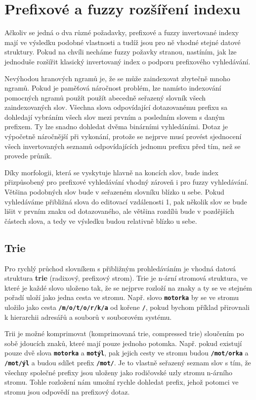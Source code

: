 \documentclass[12pt,letterpaper,oneside,openright]{book}
\newcommand{\bftt}[1]{\texttt{\textbf{#1}}}
\begin{document}
\section{Prefixové a fuzzy rozšíření indexu}
Ačkoliv se jedná o dva různé požadavky, prefixové a fuzzy invertované indexy
mají ve výsledku podobné vlastnosti a tudíž jsou pro ně vhodné stejné datové
struktury. Pokud na chvíli necháme fuzzy požavky stranou, nastíním, jak lze
jednoduše rozšířit klasický invertovaný index o podporu prefixového
vyhledávání.

Nevýhodou hranových ngramů je, že se může zaindexovat zbytečně mnoho ngramů.
Pokud je paměťová náročnost problém, lze namísto indexování pomocných ngramů
použít použít abecedně seřazený slovník všech zaindexovaných slov.  Všechna
slova odpovídající dotazovanému prefixu sa dohledají vybráním všech slov mezi
prvním a posledním slovem s daným prefixem. Ty lze snadno dohledat dvěma
binárními vyhledáními. Dotaz je výpočetně náročnější při vykonání, protože se
nejprve musí provést sjednocení všech invertovaných seznamů odpovídajících
jednomu prefixu před tím, než se provede průnik.

Díky morfologii, která se vyskytuje hlavně na koncích slov, bude index
přizpůsobený pro prefixové vyhledávání vhodný zároveň i pro fuzzy vyhledávání.
Většina podobných slov bude v seřazeném slovníku blízko u sebe. Pokud
vyhledáváme přibližná slova do editovací vzdálenosti 1, pak několik slov se
bude lišit v prvním znaku od dotazovaného, ale většina rozdílů bude v
pozdějších částech slova, a tedy ve výsledku budou relativně blízko u sebe.


\subsection{Trie}
Pro rychlý průchod slovníkem s přibližným prohledáváním je vhodná datová
struktura \textbf{trie} (radixový, prefixový strom). Trie je n-ární stromová
struktura, ve které je každé slovo uloženo tak, že se nejprve rozloží na znaky
a ty se ve stejném pořadí uloží jako jedna cesta ve stromu. Např. slovo
\bftt{motorka} by se ve stromu uložilo jako cesta \bftt{/m/o/t/o/r/k/a} od
kořene \bftt{/}, pokud bychom příklad přirovnali k hierarchii adresářů a
souborů v souborovém systému.

Trii je možné komprimovat (komprimovaná trie, compressed trie) sloučením po
sobě jdoucích znaků, které mají pouze jednoho potomka. Např. pokud existují
pouze dvě slova \bftt{motorka} a \bftt{motýl}, pak jejich cesty ve stromu
budou \bftt{/mot/orka} a \bftt{/mot/ýl} a budou sdílet prefix \bftt{/mot/}.
Je to vlastně seřazený seznam slov s tím, že všechny společné prefixy jsou
uloženy jako rodičovské uzly stromu n-árního stromu. Tohle rozložení nám umožní
rychle dohledat prefix, jehož potomci ve stromu jsou odpovědí na prefixový
dotaz.
\end{document}
